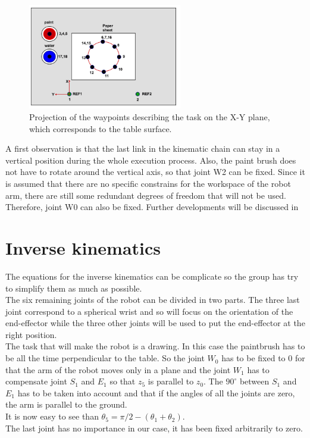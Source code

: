 \begin{figure}[h!]
	\centering
    \includegraphics[width = 0.6\textwidth]{Images/Task}
    \caption{Projection of the waypoints describing the task on the X-Y plane, which corresponds to the table surface.}
    \label{fig:Task}
\end{figure}

\bigskip
A first observation is that the last link in the kinematic chain can stay in a vertical position during the whole execution process. Also, the paint brush does not have to rotate around the vertical axis, so that joint W2 can be fixed. Since it is assumed that there are no specific constrains for the workspace of the robot arm, there are still some redundant degrees of freedom that will not be used. Therefore, joint W0 can also be fixed. Further developments will be discussed in


\section{Inverse kinematics}
\label{sec: inv}
The equations for the inverse kinematics can be complicate so the group has try to simplify them as much as possible.\\
The six remaining joints of the robot can be divided in two parts. The three last joint correspond to a spherical wrist and so will focus on the orientation of the end-effector while the three other joints will be used to put the end-effector at the right position.\\

The task that will make the robot is a drawing. In this case the paintbrush has to be all the time perpendicular to the table. So the joint $W_0$ has to be fixed to 0 for that the arm of the robot moves only in a plane and the joint $W_1$ has to compensate joint $S_1$ and $E_1$ so that $z_5$ is parallel to $z_0$. The $90^{\circ}$ between $S_1$ and $E_1$ has to be taken into account and that if the angles of all the joints are zero, the arm is parallel to the ground.\\
It is now easy to see than $\theta_5 = \pi /2 - (\theta_1 + \theta_2)$. \\
The last joint has no importance in our case, it has been fixed arbitrarily to zero.\\

